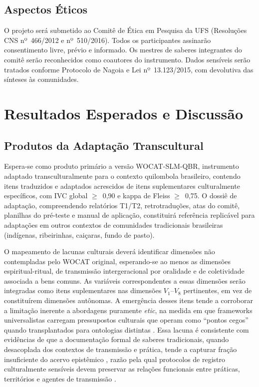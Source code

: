 \documentclass[3p,times]{elsarticle}
\begin{document}
\subsection{Aspectos Éticos}

O projeto será submetido ao Comitê de Ética em Pesquisa da UFS (Resoluções CNS nº~466/2012 e nº~510/2016). Todos os participantes assinarão consentimento livre, prévio e informado. Os mestres de saberes integrantes do comitê serão reconhecidos como coautores do instrumento. Dados sensíveis serão tratados conforme Protocolo de Nagoia e Lei nº~13.123/2015, com devolutiva das sínteses às comunidades.


\section{Resultados Esperados e Discussão}
\label{sec:results_discussion}

\subsection{Produtos da Adaptação Transcultural}

Espera-se como produto primário a versão WOCAT-SLM-QBR, instrumento adaptado transculturalmente para o contexto quilombola brasileiro, contendo itens traduzidos e adaptados acrescidos de itens suplementares culturalmente específicos, com IVC global $\geq$~0,90 e kappa de Fleiss $\geq$~0,75. O dossiê de adaptação, compreendendo relatórios T1/T2, retrotraduções, atas do comitê, planilhas do pré-teste e manual de aplicação, constituirá referência replicável para adaptações em outros contextos de comunidades tradicionais brasileiras (indígenas, ribeirinhas, caiçaras, fundo de pasto).

O mapeamento de lacunas culturais deverá identificar dimensões não contempladas pelo WOCAT original, esperando-se ao menos as dimensões espiritual-ritual, de transmissão intergeracional por oralidade e de coletividade associada a bens comuns. As variáveis correspondentes a essas dimensões serão integradas como itens suplementares nas dimensões $V_1$--$V_8$ pertinentes, em vez de constituírem dimensões autônomas. A emergência desses itens tende a corroborar a limitação inerente a abordagens puramente \textit{etic}, na medida em que frameworks universalistas carregam pressupostos culturais que operam como ``pontos cegos'' quando transplantados para ontologias distintas \citep{Herdman1999}. Essa lacuna é consistente com evidências de que a documentação formal de saberes tradicionais, quando desacoplada dos contextos de transmissão e prática, tende a capturar fração insuficiente do acervo epistêmico \citep{Maina2012,Poorna2014}, razão pela qual protocolos de registro culturalmente sensíveis devem preservar as relações funcionais entre práticas, territórios e agentes de transmissão \citep{Balogun2021}.
\end{document}
